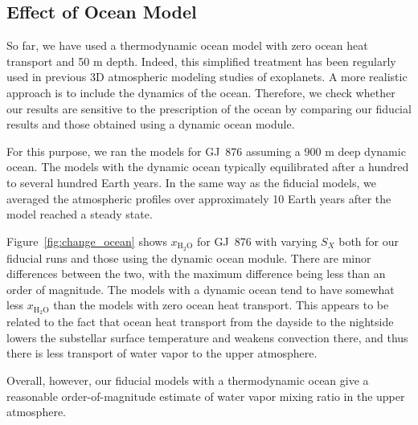\documentclass[11pt,numberedappendix,twocolappendix,]{emulateapj}
\def\water{H$_2$O}
\def\xwater{$x_\text{\water}$}
\def\wv{water vapor}
\begin{document}
\subsection{Effect of Ocean Model}
\label{ss:sensitivity_ocean}

So far, we have used a thermodynamic ocean model with zero ocean heat transport and 50 m depth. 
Indeed, this simplified treatment has been regularly used in previous 3D atmospheric modeling studies of exoplanets. 
A more realistic approach is to include the dynamics of the ocean. 
Therefore, we check whether our results are sensitive to the prescription of the ocean by comparing our fiducial results and those obtained using a dynamic ocean module. 

For this purpose, we ran the models for GJ~876 assuming a 900 m deep dynamic ocean. 
The models with the dynamic ocean typically equilibrated after a hundred to several hundred Earth years. 
In the same way as the fiducial models, we averaged the atmospheric profiles  over approximately 10 Earth years after the model reached a steady state. 

Figure~\ref{fig:change_ocean} shows \xwater{} for GJ~876 with varying $S_X$ both for our fiducial runs and those using the dynamic ocean module.  
There are minor differences between the two, with the maximum difference being less than an order of magnitude. 
The models with a dynamic ocean tend to have somewhat less \xwater{} than the models with zero ocean heat transport. 
This appears to be related to the fact that ocean heat transport from the dayside to the nightside lowers the substellar surface temperature and weakens convection there, and thus there is less transport of water vapor to the upper atmosphere. 

Overall, however, our fiducial models with a thermodynamic ocean give a reasonable order-of-magnitude estimate of \wv{} mixing ratio in the upper atmosphere. 
\end{document}
